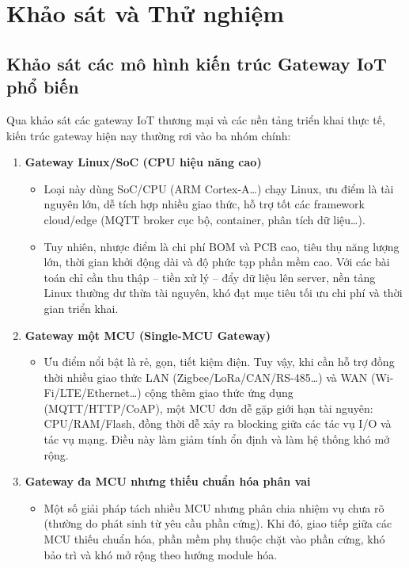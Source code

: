 \section{Khảo sát và Thử nghiệm}

    \subsection{Khảo sát các mô hình kiến trúc Gateway IoT phổ biến}
        Qua khảo sát các gateway IoT thương mại và các nền tảng triển khai thực tế, kiến trúc gateway hiện nay thường rơi vào ba nhóm chính:

        \begin{enumerate}
            \item \textbf{Gateway Linux/SoC (CPU hiệu năng cao)}
            \begin{itemize}
                \item Loại này dùng SoC/CPU (ARM Cortex-A\ldots) chạy Linux, ưu điểm là tài nguyên lớn, dễ tích hợp nhiều giao thức, hỗ trợ tốt các framework cloud/edge (MQTT broker cục bộ, container, phân tích dữ liệu\ldots).
                \item Tuy nhiên, nhược điểm là chi phí BOM và PCB cao, tiêu thụ năng lượng lớn, thời gian khởi động dài và độ phức tạp phần mềm cao. Với các bài toán chỉ cần thu thập – tiền xử lý – đẩy dữ liệu lên server, nền tảng Linux thường dư thừa tài nguyên, khó đạt mục tiêu tối ưu chi phí và thời gian triển khai.
            \end{itemize}
            
            \item \textbf{Gateway một MCU (Single-MCU Gateway)}
            \begin{itemize}
                \item Ưu điểm nổi bật là rẻ, gọn, tiết kiệm điện. Tuy vậy, khi cần hỗ trợ đồng thời nhiều giao thức LAN (Zigbee/LoRa/CAN/RS-485\ldots) và WAN (Wi-Fi/LTE/Ethernet\ldots) cộng thêm giao thức ứng dụng (MQTT/HTTP/CoAP), một MCU đơn dễ gặp giới hạn tài nguyên: CPU/RAM/Flash, đồng thời dễ xảy ra blocking giữa các tác vụ I/O và tác vụ mạng. Điều này làm giảm tính ổn định và làm hệ thống khó mở rộng.
            \end{itemize}
            
            \item \textbf{Gateway đa MCU nhưng thiếu chuẩn hóa phân vai}
            \begin{itemize}
                \item Một số giải pháp tách nhiều MCU nhưng phân chia nhiệm vụ chưa rõ (thường do phát sinh từ yêu cầu phần cứng). Khi đó, giao tiếp giữa các MCU thiếu chuẩn hóa, phần mềm phụ thuộc chặt vào phần cứng, khó bảo trì và khó mở rộng theo hướng module hóa.
            \end{itemize}
        \end{enumerate}

